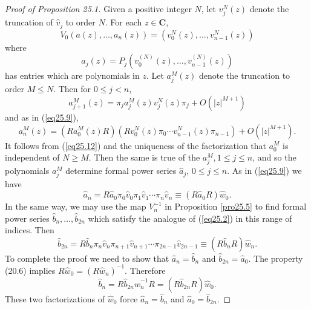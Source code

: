 \documentclass{surv-l}
\theoremstyle{plain}
\theoremstyle{definition}
\numberwithin{equation}{chapter}
\begin{document}
\begin{proof}[Proof of Proposition 25.1]\label{pop25.1}
Given a positive integer $N$, let $v_{j}^{N}(z)$ denote the truncation of $\hat{v}_{j}$ to order $N$. For each $z\in \mathbf{C}$,
\begin{equation*}
V_{0}(a(z), \ldots, a_{n}(z))=(v_{0}^{N}(z), \ldots, v_{n-1}^{N}(z))
\end{equation*}
where
\begin{equation*}
a_{j}(z)=P_{j}(v_{0}^{(N)}(z), \ldots,v_{n-1}^{(N)}(z))
\end{equation*}
has entries which are polynomials in $z$. Let $a_{j}^{M}(z)$ denote the truncation to order $M\leq N$. Then for $0\leq j<n$,
\begin{equation*}
a_{j+1}^{M}(z)=\pi_{j}a_{j}^{M}(z)v_{j}^{N}(z)\pi_{j}+O(|z|^{M+1})
\end{equation*}
and as in (\ref{eq25.9}),
\begin{equation}\label{eq25.12}
a_{n}^{M}(z)=(Ra_{0}^{M}(z)R)(Rv_{0}^{N}(z)\pi_{0}\cdots v_{n-1}^{N}(z)\pi_{n-1})+O(|z|^{M+1}).
\end{equation}
It follows from (\ref{eq25.12}) and the uniqueness of the factorization that $a_{0}^{M}$ is independent of $N\geq M$. Then the same is true of the $a_{j}^{M}, 1\leq j\leq n$, and so the polynomials $a_{j}^{M}$ determine formal power series $\hat{a}_{j},\, 0\leq j\leq n$. As in (\ref{eq25.9}) we have
\begin{equation*}
\hat{a}_{n}=R\hat{a}_{0}\pi_{0}\hat{v}_{0}\pi_{1}\hat{v}_{1}\cdots\pi_{n}\hat{v}_{n}\equiv(R\hat{a}_{0}R)\hat{w}_{0}.
\end{equation*}
In the same way, we may use the map $V_{n}^{-1}$ in Proposition \ref{pro25.5} to find formal power series $\hat{b}_{n},\ldots,\hat{b}_{2n}$ which satisfy the analogue of (\ref{eq25.2}) in this range of indices. Then
\begin{equation*}
\hat{b}_{2n}=R\hat{b}_{n}\pi_{n}\hat{v}_{n}\pi_{n+1}\hat{v}_{n+1}\cdots\pi_{2n-1}\hat{v}_{2n-1}\equiv(R\hat{b}_{n}R)\hat{w}_{n}.
\end{equation*}
To complete the proof we need to show that $\hat{a}_{n}=\hat{b}_{n}$ and $\hat{b}_{2n}=\hat{a}_{0}$. The property (20.6) implies $R\hat{w}_{0}=(R\hat{w}_{n})^{-1}$. Therefore
\begin{equation*}
\hat{b}_{n}=R\hat{b}_{2n}\hat{w}_{n}^{-1}R=(R\hat{b}_{2n}R)\hat{w}_{0}.
\end{equation*}
These two factorizations of $\hat{w}_{0}$ force $\hat{a}_{n}=\hat{b}_{n}$ and $\hat{a}_{0}=\hat{b}_{2n}$.
\end{proof}
\end{document}
